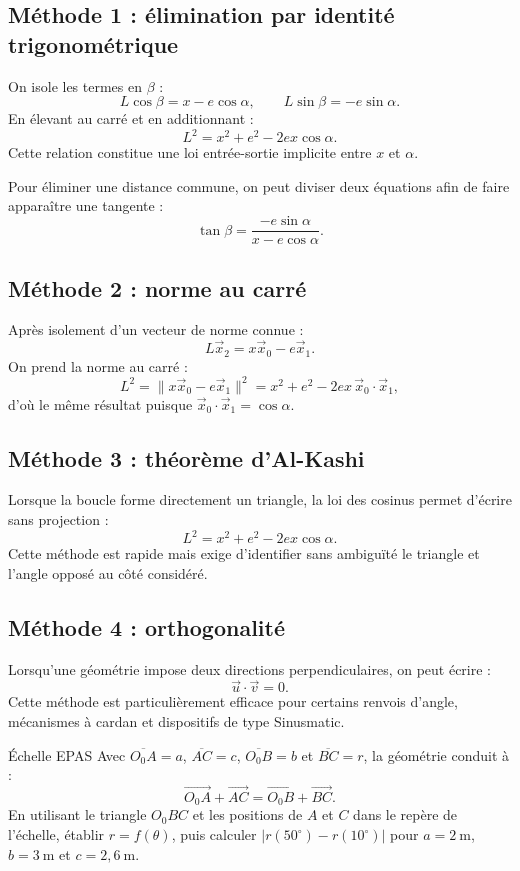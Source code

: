 \subsection{Méthode 1 : élimination par identité trigonométrique}

On isole les termes en $\beta$ :
\[
L\cos\beta=x-e\cos\alpha,
\qquad
L\sin\beta=-e\sin\alpha.
\]
En élevant au carré et en additionnant :
\[
\boxed{L^2=x^2+e^2-2ex\cos\alpha.}
\]
Cette relation constitue une loi entrée-sortie implicite entre $x$ et
$\alpha$.

Pour éliminer une distance commune, on peut diviser deux équations afin
de faire apparaître une tangente :
\[
\tan\beta=\frac{-e\sin\alpha}{x-e\cos\alpha}.
\]

\subsection{Méthode 2 : norme au carré}

Après isolement d'un vecteur de norme connue :
\[
L\vec x_2=x\vec x_0-e\vec x_1.
\]
On prend la norme au carré :
\[
L^2=\|x\vec x_0-e\vec x_1\|^2
=x^2+e^2-2ex\,\vec x_0\cdot\vec x_1,
\]
d'où le même résultat puisque
$\vec x_0\cdot\vec x_1=\cos\alpha$.

\subsection{Méthode 3 : théorème d'Al-Kashi}

Lorsque la boucle forme directement un triangle, la loi des cosinus
permet d'écrire sans projection :
\[
\boxed{L^2=x^2+e^2-2ex\cos\alpha.}
\]
Cette méthode est rapide mais exige d'identifier sans ambiguïté le
triangle et l'angle opposé au côté considéré.

\subsection{Méthode 4 : orthogonalité}

Lorsqu'une géométrie impose deux directions perpendiculaires, on peut
écrire :
\[
\vec u\cdot\vec v=0.
\]
Cette méthode est particulièrement efficace pour certains renvois
d'angle, mécanismes à cardan et dispositifs de type Sinusmatic.

\begin{TLThreeApp}{Échelle EPAS}
Avec $\overline{O_0A}=a$, $\overline{AC}=c$,
$\overline{O_0B}=b$ et $\overline{BC}=r$, la géométrie conduit à :
\[
\overrightarrow{O_0A}+\overrightarrow{AC}
=\overrightarrow{O_0B}+\overrightarrow{BC}.
\]
En utilisant le triangle $O_0BC$ et les positions de $A$ et $C$ dans
le repère de l'échelle, établir $r=f(\theta)$, puis calculer
$|r(50^\circ)-r(10^\circ)|$ pour $a=2\ \mathrm m$,
$b=3\ \mathrm m$ et $c=2{,}6\ \mathrm m$.
\end{TLThreeApp}

